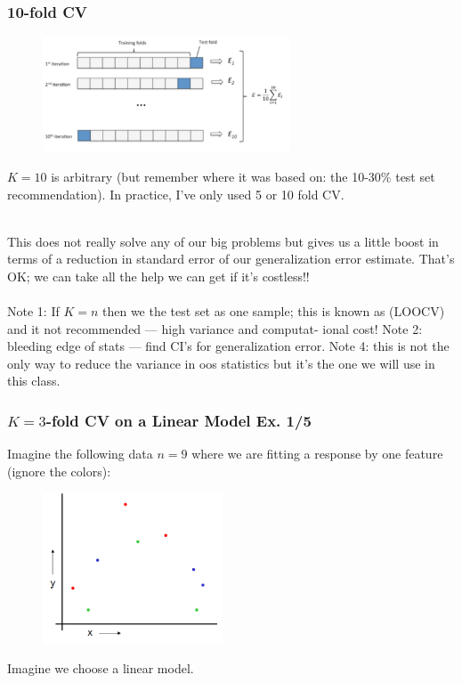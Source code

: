 \documentclass[handout]{beamer}
\begin{document}
\begin{frame}\frametitle{10-fold CV}

\begin{figure}
\centering
\includegraphics[width=2.9in]{10_fold_cv2.png}
\end{figure}

\vspace{-0.3cm}
\small
$K=10$ is arbitrary (but remember where it was based on: the 10-30\% test set recommendation). In practice, I've only used 5 or 10 fold CV. \\~\\ \pause

\vspace{-0.3cm}
This does not really solve any of our big problems but gives us a little boost in terms of a reduction in standard error of our generalization error estimate. \pause That's OK; we can take all the help we can get if it's costless!! \\~\\

\vspace{-0.4cm}\footnotesize
Note 1: If $K=n$ then we the test set as one sample; this is known as  (LOOCV) and it not recommended --- high variance and \pause computat- ional cost! \pause Note 2: bleeding edge of stats --- find CI's for generalization error. \pause Note 4: this is not the only way to reduce the variance in oos statistics but it's the one we will use in this class.

	
\end{frame}


\begin{frame}\frametitle{$K=3$-fold CV on a Linear Model Ex. 1/5}

Imagine the following data $n=9$ where we are fitting a response by one feature (ignore the colors):

\begin{figure}
\centering
\includegraphics[width=2.1in]{data.PNG}
\end{figure}

Imagine we choose a linear model. 
	
\end{frame}
\end{document}
